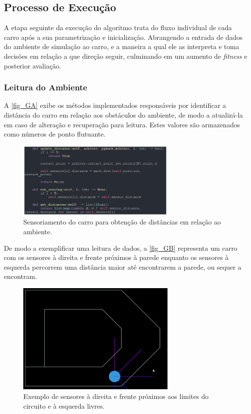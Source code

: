 \subsection{Processo de Execução}
A etapa seguinte da execução do algoritmo trata do fluxo individual de cada carro após a sua parametrização e inicialização.
Abrangendo a entrada de dados do ambiente de simulação ao carro, e a maneira a qual ele as interpreta e toma decisões em relação a que direção seguir,
culminando em um aumento de \textit{fitness} e posterior avaliação.

\subsubsection{Leitura do Ambiente}
A \autoref{fig_GA} exibe os métodos implementados responsáveis por identificar a distância do carro em relação
aos obstáculos do ambiente, de modo a atualizá-la em caso de alteração e recuperação para leitura. Estes valores
são armazenados como números de ponto flutuante.

\begin{figure}[htb]
        \centering
        \caption{\label{fig_GA}Sensoriamento do carro para obtenção de distâncias em relação ao ambiente.}
        \includegraphics[width=0.7\textwidth]{images/GA.png}
\end{figure}

De modo a exemplificar uma leitura de dados, a \autoref{fig_GB} representa um carro com os sensores à direita
e frente próximos à parede enquanto os sensores à esquerda percorrem uma distância maior até encontrarem a parede,
ou sequer a encontram.

\begin{figure}[htb]
        \centering
        \caption{\label{fig_GB}Exemplo de sensores à direita e frente próximos aos limites do circuito e à esquerda livres.}
        \includegraphics[width=0.7\textwidth]{images/GB.png}
\end{figure}

